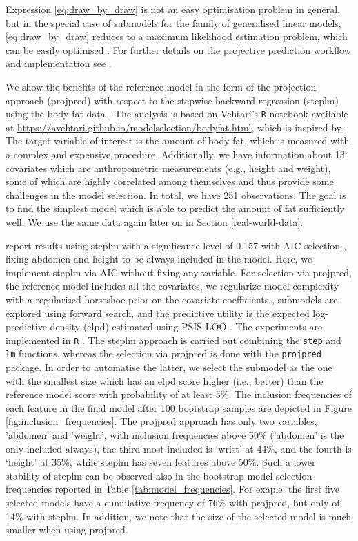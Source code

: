 \documentclass[american,]{article}
\theoremstyle{definition}
\begin{document}
Expression \eqref{eq:draw_by_draw} is not an easy optimisation problem in general, but in the special case of submodels for the family of generalised linear models, \eqref{eq:draw_by_draw} reduces to a maximum likelihood estimation problem, which can be easily optimised \citep{paper:original_proj}. For further details on the projective prediction workflow and implementation see \cite{paper:projpred}.

We show the benefits of the reference model in the form of the projection approach (projpred) with respect to the stepwise backward regression (steplm) using the body fat data \citep{johnson1996fitting}. The analysis is based on Vehtari's \texttt{R}-notebook available at \url{https://avehtari.github.io/modelselection/bodyfat.html}, which is inspired by \cite{paper:bodyfat}. The target variable of interest is the amount of body fat, which is measured with a complex and expensive procedure. Additionally, we have information about 13 covariates which are anthropometric measurements (e.g., height and weight), some of which are highly correlated among themselves and thus provide some challenges in the model selection. In total, we have 251 observations. The goal is to find the simplest model which is able to predict the amount of fat sufficiently well. We use the same data again later on in Section \ref{real-world-data}.

\cite{paper:bodyfat} report results using steplm with a significance level of 0.157 with AIC selection \citep{akaike1974new}, fixing abdomen and height to be always included in the model. Here, we implement steplm via AIC without fixing any variable. For selection via projpred, the reference model includes all the covariates, we regularize model complexity with a regularised horseshoe prior on the covariate coefficients \citep{paper:rhs}, submodels are explored using forward search, and the predictive utility is the expected log-predictive density (elpd) estimated using PSIS-LOO \citep{paper:psis_loo}. The experiments are implemented in \texttt{R} \citep{Rcore2018}. The steplm approach is carried out combining the \texttt{step} and \texttt{lm} functions, whereas the selection via projpred is done with the \texttt{projpred} package. In order to automatise the latter, we select the submodel as the one with the smallest size which has an elpd score higher (i.e., better) than the reference model score with probability of at least 5\%. The inclusion frequencies of each feature in the final model after 100 bootstrap samples are depicted in Figure \ref{fig:inclusion_frequencies}. The projpred approach has only two variables, 'abdomen' and 'weight', with inclusion frequencies above 50\% ('abdomen' is the only included always), the third most included is `wrist' at 44\%, and the fourth is `height' at 35\%, while steplm has seven features above 50\%. Such a lower stability of steplm can be observed also in the bootstrap model selection frequencies reported in Table \ref{tab:model_frequencies}. For exaple, the first five selected models have a cumulative frequency of 76\% with projpred, but only of 14\% with steplm. In addition, we note that the size of the selected model is much smaller when using projpred.
\end{document}
